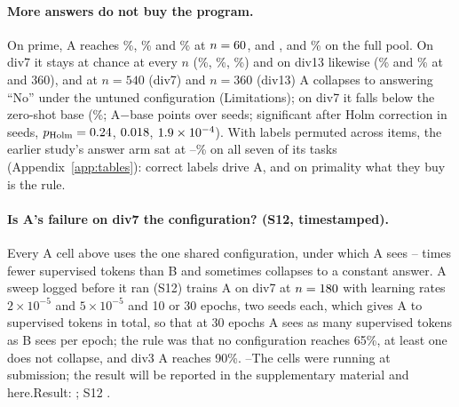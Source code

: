 \documentclass{article}
\theoremstyle{definition}
\def\NRToken{--}\def\PendingToken{pending}   %
\begin{document}
\paragraph{More answers do not buy the program.} On prime, A reaches \primeAsmall\%, \primeA\% and \primeAlarge\% at $n=60$, \nTrain{} and \nTrainLarge{}, and \primeAtok\% on the full pool. On div7 it stays at chance at every $n$ (\divsevenAnSixty\%, \divsevenAnOneEighty\%, \divsevenAnFiveForty\%) and on div13 likewise (\divthirteenAnOneEighty\% and \divthirteenAnThreeSixty\% at \nTrain{} and 360), and at $n=540$ (div7) and $n=360$ (div13) A collapses to answering ``No'' under the untuned configuration (Limitations); on div7 it falls below the zero-shot base (\divsevenBase\%; A$-$base \divsevenBootABaseDiff{} \divsevenBootABaseCi{} points over \divsevenBootABaseSeeds{} seeds; significant after Holm correction in \divsevenABaseHolmSig{} seeds, $p_{\mathrm{Holm}}=0.24$, $0.018$, $1.9\times 10^{-4}$). With labels permuted across items, the earlier study's answer arm sat at \shufMin--\shufMax\% on all seven of its tasks (Appendix~\ref{app:tables}): correct labels drive A, and on primality what they buy is the rule.

\paragraph{Is A's failure on div7 the configuration? (S12, timestamped).} Every A cell above uses the one shared configuration, under which A sees \tokRatioLow--\tokRatioHigh{} times fewer supervised tokens than B and sometimes collapses to a constant answer. A sweep logged before it ran (S12) trains A on div7 at $n=180$ with learning rates $2\times10^{-5}$ and $5\times10^{-5}$ and 10 or 30 epochs, two seeds each, which gives A \sweepAlrTwoEpTenTok{} to \sweepAlrFiveEpThirtyTok{} supervised tokens in total, so that at 30 epochs A sees as many supervised tokens as B sees per epoch; the rule was that no configuration reaches 65\%, at least one does not collapse, and div3 A reaches 90\%. \ifx\sweepAmax\NRToken The cells were running at submission; the result will be reported in the supplementary material and here.\else Result: \STwelveResult; S12 \STwelveVerdict.\fi
\end{document}
